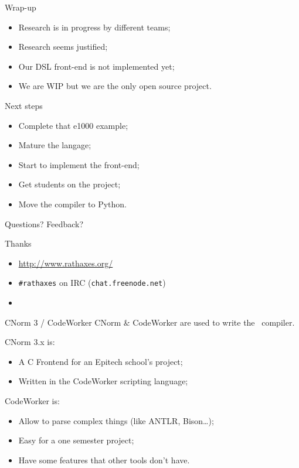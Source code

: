 \documentclass[xcolor={usenames,svgnames}]{beamer}
\begin{document}
\begin{frame}{Wrap-up}
\Large{
\begin{itemize}
\item Research is in progress by different teams;
\item Research seems justified;
\item Our DSL front-end is not implemented yet;
\item We are WIP but we are the only open source project.
\end{itemize}
}
\end{frame}

\begin{frame}{Next steps}
\Large{
\begin{itemize}
\item Complete that e1000 example;
\item Mature the langage;
\item Start to implement the front-end;
\item Get students on the project;
\item Move the compiler to Python.
\end{itemize}
}
\end{frame}

\begin{frame}{Questions? Feedback?}
\begin{center}
\Huge{Thanks}

\end{center}
\vspace{2em}
\begin{itemize}
\item \Large{\url{http://www.rathaxes.org/}}
\item \Large{\texttt{\#rathaxes} on IRC (\texttt{chat.freenode.net})}
\item \Large{\twitter}
\end{itemize}
\end{frame}

\begin{frame}{CNorm 3 / CodeWorker}
CNorm \& CodeWorker are used to write the \rtx\ compiler.

\vspace{1ex}

CNorm 3.x is:
\begin{itemize}
\item A C Frontend for an Epitech school's project;
\item Written in the CodeWorker scripting language;
\end{itemize}
CodeWorker is:
\begin{itemize}
\item Allow to parse complex things (like ANTLR, Bison…);
\item Easy for a one semester project;
\item Have some features that other tools don't have.
\end{itemize}
\end{frame}
\end{document}
